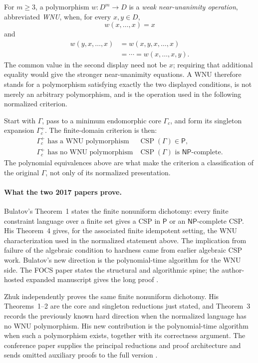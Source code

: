 For \(m\geq3\), a polymorphism \(w:D^m\to D\) is a
\emph{weak near-unanimity operation}, abbreviated \emph{WNU}, when, for every
\(x,y\in D\),
\[
 w(x,\ldots,x)=x
\]
and
\[
 \begin{split}
 w(y,x,\ldots,x)
   &=w(x,y,x,\ldots,x)\\
   &=\cdots
    =w(x,\ldots,x,y).
 \end{split}
\]
The common value in the second display need not be \(x\); requiring that
additional equality would give the stronger near-unanimity equations.  A WNU
therefore stands for a polymorphism satisfying exactly the two displayed
conditions, is not merely an arbitrary polymorphism, and is the operation used
in the following normalized criterion.

Start with \(\Gamma\), pass to a minimum endomorphic core \(\Gamma_c\), and
form its singleton expansion \(\Gamma_c^+\).  The finite-domain criterion is
then:
\[
 \begin{array}{c|c}
 \Gamma_c^+\text{ has a WNU polymorphism}
   & \operatorname{CSP}(\Gamma)\in\mathsf P,\\[2pt]
 \Gamma_c^+\text{ has no WNU polymorphism}
   & \operatorname{CSP}(\Gamma)\text{ is }\mathsf{NP}\text{-complete}.
 \end{array}
\]
The polynomial equivalences above are what make the criterion a classification
of the original \(\Gamma\), not only of its normalized presentation.

\paragraph{What the two 2017 papers prove.}
Bulatov's Theorem~1 states the finite nonuniform dichotomy: every finite
constraint language over a finite set gives a CSP in \(\mathsf P\) or an
\(\mathsf{NP}\)-complete CSP.  His Theorem~4 gives, for the associated finite
idempotent setting, the WNU characterization used in the normalized statement
above.  The implication from failure of the algebraic condition to hardness
came from earlier algebraic CSP work.  Bulatov's new direction is the
polynomial-time algorithm for the WNU side.  The FOCS paper states the
structural and algorithmic spine; the author-hosted expanded manuscript gives
the long proof \cite[thms.~1 and 4]{Bulatov2017}.

Zhuk independently proves the same finite nonuniform dichotomy.  His
Theorems~1--2 are the core and singleton reductions just stated, and
Theorem~3 records the previously known hard direction when the normalized
language has no WNU polymorphism.  His new contribution is the polynomial-time
algorithm when such a polymorphism exists, together with its correctness
argument.  The conference paper supplies the principal reductions and proof
architecture and sends omitted auxiliary proofs to the full version
\cite[pp.~331--336 and 341--342]{Zhuk2017}.

